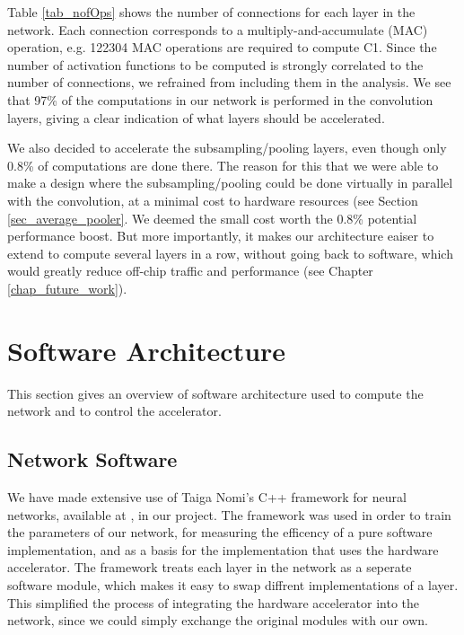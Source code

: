 Table \ref{tab_nofOps} shows the number of connections for each layer in the network. Each connection corresponds to a multiply-and-accumulate (MAC) operation, e.g. 122304 MAC operations are required to compute C1. Since the number of activation functions to be computed is strongly correlated to the number of connections, we refrained from including them in the analysis. 
We see that 97\% of the computations in our network is performed in the convolution layers, giving a clear indication of what layers should be accelerated.


We also decided to accelerate the subsampling/pooling layers, even though only 0.8\% of computations are done there. The reason for this that we were able to make a design where the subsampling/pooling could be done virtually in parallel with the convolution, at a minimal cost to hardware resources (see Section \ref{sec_average_pooler}. We deemed the small cost worth the 0.8\% potential performance boost. But more importantly, it makes our architecture eaiser to extend to compute several layers in a row, without going back to software, which would greatly reduce off-chip traffic and performance (see Chapter \ref{chap_future_work}).


\section{Software Architecture}

This section gives an overview of software architecture used to compute the network and to control the accelerator.

\subsection{Network Software}

We have made extensive use of Taiga Nomi's C++ framework for neural networks, available at \cite{Nomi2015}, in our project. The framework was used in order to train the parameters of our network, for measuring the efficency of a pure software implementation, and as a basis for the implementation that uses the hardware accelerator. The framework treats each layer in the network as a seperate software module, which makes it easy to swap diffrent implementations of a layer. This simplified the process of integrating the hardware accelerator into the network, since we could simply exchange the original modules with our own.

